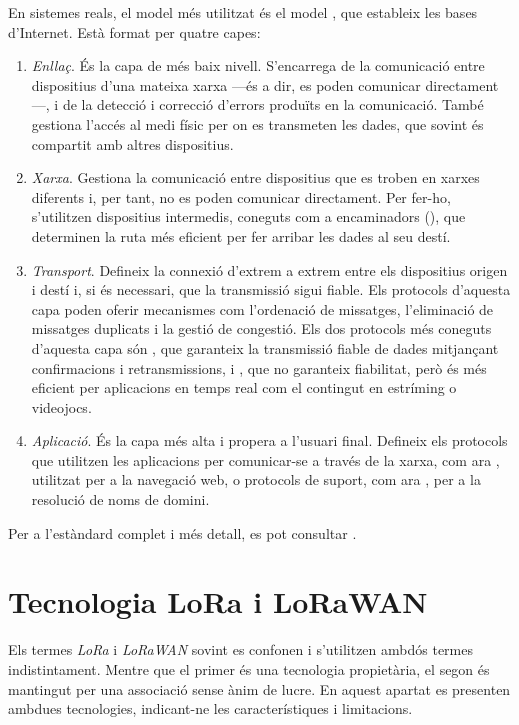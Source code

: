 \documentclass{tfgitic}[2024/07/01]
\begin{document}
En sistemes reals, el model més utilitzat és el model , que estableix les bases d'Internet. Està format per quatre capes:
\begin{enumerate}
    \item \emph{Enllaç}. És la capa de més baix nivell. S'encarrega de la comunicació entre dispositius d'una mateixa xarxa ---és a dir, es poden comunicar directament---, i de la detecció i correcció d'errors produïts en la comunicació. També gestiona l'accés al medi físic per on es transmeten les dades, que sovint és compartit amb altres dispositius.
    \item \emph{Xarxa}. Gestiona la comunicació entre dispositius que es troben en xarxes diferents i, per tant, no es poden comunicar directament. Per fer-ho, s'utilitzen dispositius intermedis, coneguts com a encaminadors (), que determinen la ruta més eficient per fer arribar les dades al seu destí.
    \item \emph{Transport}. Defineix la connexió d'extrem a extrem entre els dispositius origen i destí i, si és necessari, que la transmissió sigui fiable. Els protocols d'aquesta capa poden oferir mecanismes com l'ordenació de missatges, l'eliminació de missatges duplicats i la gestió de congestió. Els dos protocols més coneguts d'aquesta capa són , que garanteix la transmissió fiable de dades mitjançant confirmacions i retransmissions, i , que no garanteix fiabilitat, però és més eficient per aplicacions en temps real com el contingut en estríming o videojocs.
    \item \emph{Aplicació}. És la capa més alta i propera a l'usuari final. Defineix els protocols que utilitzen les aplicacions per comunicar-se a través de la xarxa, com ara , utilitzat per a la navegació web, o protocols de suport, com ara , per a la resolució de noms de domini.
\end{enumerate}
Per a l'estàndard complet i més detall, es pot consultar \cite{braden_requirements_1989}. 
\section{Tecnologia LoRa i LoRaWAN}
Els termes \emph{LoRa} i \emph{LoRaWAN} sovint es confonen i s'utilitzen ambdós termes indistintament. Mentre que el primer és una tecnologia propietària, el segon és mantingut per una associació sense ànim de lucre. En aquest apartat es presenten ambdues tecnologies, indicant-ne les característiques i limitacions.
\end{document}
